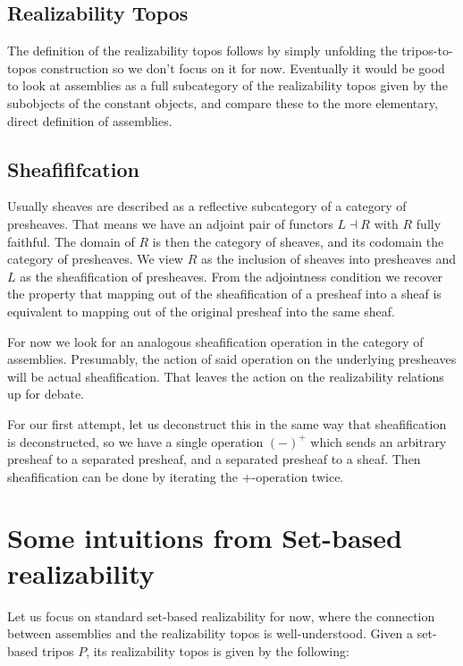 \documentclass[11pt]{article}
\begin{document}
\subsection{Realizability Topos}%
\label{sub:realizability-topos}

The definition of the realizability topos follows by simply
unfolding the tripos-to-topos construction so we don't focus on it for now.
%
Eventually it would be good to look at assemblies as a full subcategory of the
realizability topos given by the subobjects of the constant objects, and
compare these to the more elementary, direct definition of assemblies.

\subsection{Sheafififcation}

Usually sheaves are described as a reflective subcategory of a category
of presheaves.
%
That means we have an adjoint pair of functors \(L \dashv R\) with
\(R\) fully faithful.
%
The domain of \(R\) is then the category of sheaves, and its codomain the
category of presheaves.
%
We view \(R\) as the inclusion of sheaves into presheaves and \(L\)
as the sheafification of presheaves.
%
From the adjointness condition we recover the property that mapping out
of the sheafification of a presheaf into a sheaf is equivalent to mapping out
of the original presheaf into the same sheaf.

For now we look for an analogous sheafification operation in the category
of assemblies.
%
Presumably, the action of said operation on the underlying presheaves
will be actual sheafification.
%
That leaves the action on the realizability relations up for debate.

For our first attempt, let us deconstruct this in the same way that
sheafification is deconstructed, so we have a single operation
\({(-)}^{+}\) which sends an arbitrary presheaf to a separated presheaf,
and a separated presheaf to a sheaf.
%
Then sheafification can be done by iterating the \(+\)-operation twice.



\newpage
\appendix

\section{Some intuitions from Set-based realizability}

Let us focus on standard set-based realizability for now, where the connection
between assemblies and the realizability topos is well-understood.
%
Given a set-based tripos \(P\), its realizability topos is given by the
following:
\end{document}
